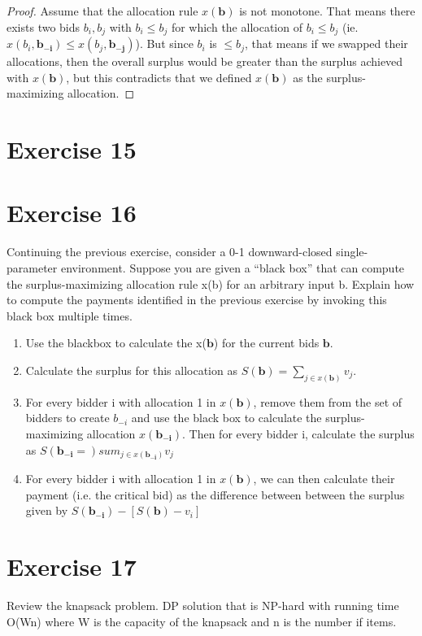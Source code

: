 \documentclass{article}
\begin{document}
\begin{proof}
	Assume that the allocation rule $x(\bm{b})$ is not monotone. That means
	there exists two bids $b_i, b_j$ with $b_i \leq b_j$ for which the
	allocation of $b_i \le b_j$ (ie. $x(b_i, \bm{b_{-i}}) \le
	x(b_j,\bm{b_{-j}})$). But since $b_i$ is $\leq b_j$, that means if we
	swapped their allocations, then the overall surplus would be greater than
	the surplus achieved with $x(\bm{b})$, but this contradicts that we
	defined $x(\bm{b})$ as the surplus-maximizing allocation.
\end{proof}

\section*{Exercise 15}
\section*{Exercise 16}
Continuing the previous exercise, consider a 0-1 downward-closed
single-parameter environment. Suppose you are given a “black box” that can
compute the surplus-maximizing allocation rule x(b) for an arbitrary input b.
Explain how to compute the payments identified in the previous exercise by invoking this black box multiple times.


\begin{enumerate}%
	\item Use the blackbox to calculate the x($\bm{b}$) for the current bids $\bm{b}$.
	\item Calculate the surplus for this allocation as $S(\bm{b}) = \sum_{j \in x(\bm{b})}v_j$.
	\item For every bidder i with allocation 1 in $x(\bm{b})$, remove them
		from the set of bidders to create $b_{-i}$ and use the black box to
		calculate the surplus-maximizing allocation $x(\bm{b_{-i}})$.  Then
		for every bidder i, calculate the surplus as $S(\bm{b_{-i}}=)sum_{j \in
		x(\bm{b_{-i}})} v_j$
	\item For every bidder i with allocation 1 in $x(\bm{b})$, we can then
		calculate their payment (i.e. the critical bid)
		as the difference between between the surplus given by $S(\bm{b_{-i}})-[S(\bm{b}) - v_i]$
\end{enumerate}

\section*{Exercise 17}
Review the knapsack problem.  DP solution that is NP-hard with running time
O(Wn) where W is the capacity of the knapsack and n is the number if items.
\end{document}

